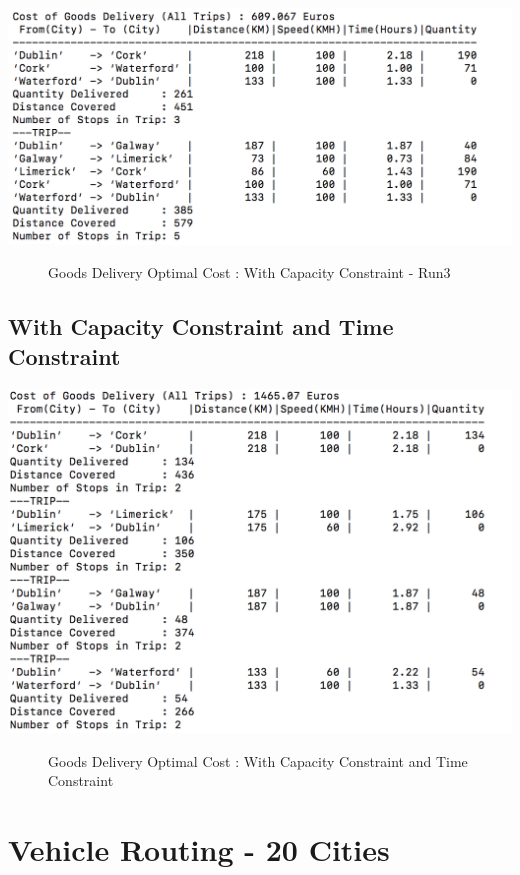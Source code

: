 \documentclass[a4paper&11pt]{article}
\begin{document}
\begin{center}
\includegraphics[scale=0.8]{fig3.png}
\begin{figure}[H]
\caption{Goods Delivery Optimal Cost :  With Capacity Constraint - Run3}
\label{fig:fig3}
\end{figure}
\end{center}

\subsection*{With Capacity Constraint and Time Constraint}

\begin{center}
\includegraphics[scale=0.8]{fig4.png}
\begin{figure}[H]
\caption{Goods Delivery Optimal Cost :  With Capacity Constraint  and Time Constraint}
\label{fig:fig4}
\end{figure}
\end{center}

\section*{Vehicle Routing  - 20 Cities}
\end{document}
